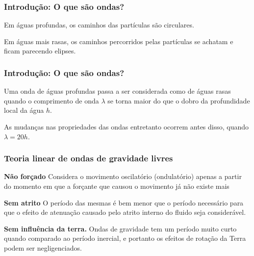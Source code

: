 \begin{frame}
\frametitle{Introdução: O que são ondas?}
    \begin{block}{}
      Em águas profundas, os caminhos das partículas são circulares.
    \end{block}

    \begin{block}{}
      Em águas mais rasas, os caminhos percorridos pelas partículas se achatam e
      ficam parecendo elipses.
    \end{block}
\end{frame}


\begin{frame}
\frametitle{Introdução: O que são ondas?}
  \begin{block}{}
    Uma onda de águas profundas passa a ser considerada
    como de águas rasas quando o comprimento de onda $\lambda$ se torna maior
    do que o dobro da profundidade local da água $h$.
  \end{block}

  \begin{block}{}
    As mudanças nas propriedades das ondas entretanto ocorrem antes disso,
    quando $\lambda = 20 h$.
  \end{block}
\end{frame}


\begin{frame}
\frametitle{Teoria linear de ondas de gravidade livres}
\scriptsize{
    \begin{block}{{\bf Não forçado}}
        Considera o movimento oscilatório (ondulatório) apenas a partir do
        momento em que a forçante que causou o movimento já não existe mais
    \end{block}

    \pause
    \begin{block}{{\bf Sem atrito}}
        O período das mesmas é bem menor que o período necessário para que o
        efeito de atenuação causado pelo atrito interno do fluido seja
        considerável.
    \end{block}

    \pause
    \begin{block}{{\bf Sem influência da terra.}}
        Ondas de gravidade tem um período muito curto quando comparado ao
        período inercial, e portanto os efeitos de rotação da Terra podem ser
        negligenciados.
    \end{block}
}
\end{frame}

